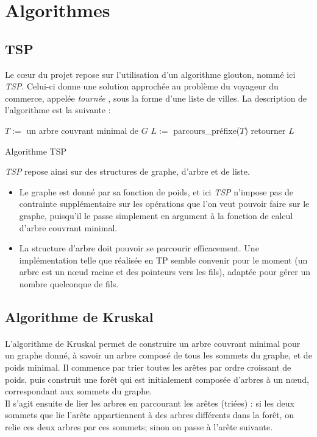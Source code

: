 \documentclass[a4paper]{article}
\begin{document}
\bigskip

\section{Algorithmes}

\subsection{TSP}
Le cœur du projet repose sur l'utilisation d'un algorithme glouton, nommé ici \emph{TSP}. Celui-ci donne une solution approchée au problème du voyageur du commerce, appelée \textit{tournée} , sous la forme d'une liste de villes. La description de l'algorithme est la suivante :

\begin{algorithm}[H]
  \SetAlgoLined
  $T := $ un arbre couvrant minimal de $G$\;
  $L := $ parcours\_préfixe($T$)\;
  retourner $L$\;
  \caption{Algorithme TSP}
\end{algorithm}

\emph{TSP} repose ainsi sur des structures de graphe, d'arbre et de liste. \\
\begin{itemize}
\item Le graphe est donné par sa fonction de poids, et ici \emph{TSP} n'impose pas de contrainte supplémentaire sur les opérations que l'on veut pouvoir faire sur le graphe, puisqu'il le passe simplement en argument à la fonction de calcul d'arbre couvrant minimal.
\item La structure d'arbre doit pouvoir se parcourir efficacement. Une implémentation telle que réalisée en TP semble convenir pour le moment (un arbre est un nœud racine et des pointeurs vers les fils), adaptée pour gérer un nombre quelconque de fils.
\end{itemize}

\subsection{Algorithme de {\sc Kruskal}}
\label{sse:kruskalAlgo}

\paragraph*{} L'algorithme de {\sc Kruskal} permet de construire un arbre couvrant minimal pour un graphe donné, à savoir un arbre composé de tous les sommets du graphe, et de poids minimal. Il commence par trier toutes les arêtes par ordre croissant de poids, puis construit une forêt qui est initialement composée d'arbres à un nœud, correspondant aux sommets du graphe. \\
Il s'agit ensuite de lier les arbres en parcourant les arêtes (triées) : si les deux sommets que lie l'arête appartiennent à des arbres différents dans la forêt, on relie ces deux arbres par ces sommets; sinon on passe à l'arête suivante.
\end{document}
